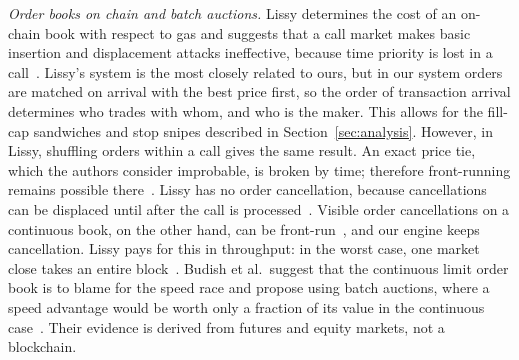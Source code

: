 \emph{Order books on chain and batch auctions.}
Lissy determines the cost of an on-chain book with respect to gas and suggests that a call market makes basic insertion and displacement attacks ineffective, because time priority is lost in a call~\cite{src09moosavi2023}. %
Lissy's system is the most closely related to ours, but in our system orders are matched on arrival with the best price first, so the order of transaction arrival determines who trades with whom, and who is the maker. %
This allows for the fill-cap sandwiches and stop snipes described in Section~\ref{sec:analysis}.
However, in Lissy, shuffling orders within a call gives the same result. %
An exact price tie, which the authors consider improbable, is broken by time; therefore front-running remains possible there~\cite{src09moosavi2023}. %
Lissy has no order cancellation, because cancellations can be displaced until after the call is processed~\cite{src09moosavi2023}. %
Visible order cancellations on a continuous book, on the other hand, can be front-run~\cite{src02eskandari2019}, and our engine keeps cancellation. %
Lissy pays for this in throughput: in the worst case, one market close takes an entire block~\cite{src09moosavi2023}. %
Budish et al.\ suggest that the continuous limit order book is to blame for the speed race and propose using batch auctions, where a speed advantage would be worth only a fraction of its value in the continuous case~\cite{src11budish2015}. %
Their evidence is derived from futures and equity markets, not a blockchain.

